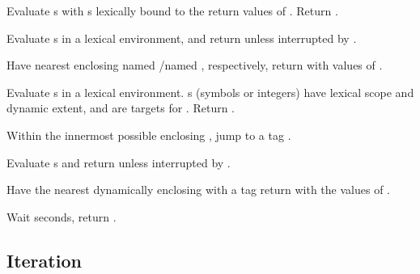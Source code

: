 \begin{LIST}{1cm}
  {
    Evaluate s with s lexically bound to the
    return values of . Return .
  }

  { 
    Evaluate s in a lexical environment, and
    return  unless interrupted by
    . 
  }

  {
    Have nearest enclosing  named /named \NIL,
    respectively, return with values of .  
  }

  {
    Evaluate s in a lexical environment. s (symbols
    or integers) have lexical scope and dynamic extent, and are
    targets for . Return \retval{\NIL}.
  }

  {
    Within the innermost possible enclosing , jump to a
    tag  .
  }

  {
    Evaluate s and return  unless
    interrupted by . 
  }

  {
    Have the nearest dynamically
    enclosing  with a tag   return with the
    values of .
  }

  {
    Wait  seconds, return \retval{\NIL}.
  }

\end{LIST}


\subsection{Iteration}

